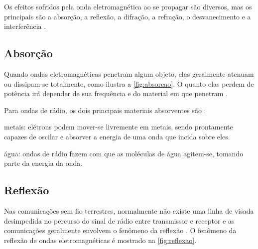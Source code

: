 Os efeitos sofridos pela onda eletromagnética ao se propagar são diversos, mas os principais são a absorção, a reflexão, a difração, a refração, o desvanecimento e a interferência \cite{flickenger2008,haykin2008,rappaport2009}.

\subsection{Absorção}
\label{sub:absorcao}

Quando ondas eletromagnéticas penetram algum objeto, elas geralmente atenuam ou dissipam-se totalmente, como ilustra a \autoref{fig:absorcao}. O quanto elas perdem de potência irá depender de sua frequência e do material em que penetram \cite{flickenger2008}.

\begin{figure}[H]
	\centering
\end{figure}

Para ondas de rádio, os dois principais materiais absorventes são \cite{flickenger2008}:

\begin{compactitem}
	\item metais: elétrons podem mover-se livremente em metais, sendo prontamente capazes de oscilar e absorver a energia de uma onda que incida sobre eles.
	\item água: ondas de rádio fazem com que as moléculas de água agitem-se, tomando parte da energia da onda.
\end{compactitem}

\subsection{Reflexão}
\label{sub:reflexao}

Nas comunicações sem fio terrestres, normalmente não existe uma linha de visada desimpedida no percurso do sinal de rádio entre transmissor e receptor e as comunicações geralmente envolvem o fenômeno da reflexão \cite{haykin2008}. O fenômeno da reflexão de ondas eletromagnéticas é mostrado na \autoref{fig:reflexao}.

